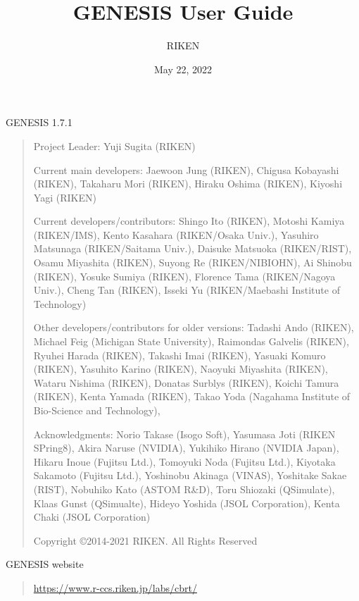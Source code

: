 \documentclass[a4paper,11pt,oneside,english]{sphinxmanual}
\title{GENESIS User Guide}
\date{May 22, 2022}
\author{RIKEN}
\begin{document}
\pagestyle{empty}
\sphinxmaketitle
\pagestyle{plain}

\begin{center}
{\Huge GENESIS 1.7.1}
\end{center}

\vspace{2ex}

\begin{quote}
  Project Leader: Yuji Sugita (RIKEN)

  Current main developers:
  Jaewoon Jung (RIKEN), 
  Chigusa Kobayashi (RIKEN), 
  Takaharu Mori (RIKEN), 
  Hiraku Oshima (RIKEN), 
  Kiyoshi Yagi (RIKEN)

  Current developers/contributors:
  Shingo Ito (RIKEN), 
  Motoshi Kamiya (RIKEN/IMS), 
  Kento Kasahara (RIKEN/Osaka Univ.),
  Yasuhiro Matsunaga (RIKEN/Saitama Univ.),
  Daisuke Matsuoka (RIKEN/RIST), 
  Osamu Miyashita (RIKEN), 
  Suyong Re (RIKEN/NIBIOHN),
  Ai Shinobu (RIKEN), 
  Yosuke Sumiya (RIKEN),
  Florence Tama (RIKEN/Nagoya Univ.),
  Cheng Tan (RIKEN),
  Isseki Yu (RIKEN/Maebashi Institute of Technology)

  Other developers/contributors for older versions:
  Tadashi Ando (RIKEN),
  Michael Feig (Michigan State University), 
  Raimondas Galvelis (RIKEN),
  Ryuhei Harada (RIKEN), 
  Takashi Imai (RIKEN), 
  Yasuaki Komuro (RIKEN), 
  Yasuhito Karino (RIKEN),
  Naoyuki Miyashita (RIKEN), 
  Wataru Nishima (RIKEN),
  Donatas Surblys (RIKEN), 
  Koichi Tamura (RIKEN), 
  Kenta Yamada (RIKEN),
  Takao Yoda (Nagahama Institute of Bio-Science and Technology),

  Acknowledgments: 
  Norio Takase (Isogo Soft), 
  Yasumasa Joti (RIKEN SPring8),
  Akira Naruse (NVIDIA), 
  Yukihiko Hirano (NVIDIA Japan),
  Hikaru Inoue (Fujitsu Ltd.), 
  Tomoyuki Noda (Fujitsu Ltd.),
  Kiyotaka Sakamoto (Fujitsu Ltd.), 
  Yoshinobu Akinaga (VINAS),
  Yoshitake Sakae (RIST),
  Nobuhiko Kato (ASTOM R\&D),
  Toru Shiozaki (QSimulate), 
  Klaas Gunst (QSimualte),
  Hideyo Yoshida (JSOL Corporation),
  Kenta Chaki (JSOL Corporation)

  Copyright \copyright 2014-2021 RIKEN. All Rights Reserved
\end{quote}

\vspace{3ex}

{\LARGE GENESIS website}

\begin{quote}
  \url{https://www.r-ccs.riken.jp/labs/cbrt/}
\end{quote}
\end{document}
